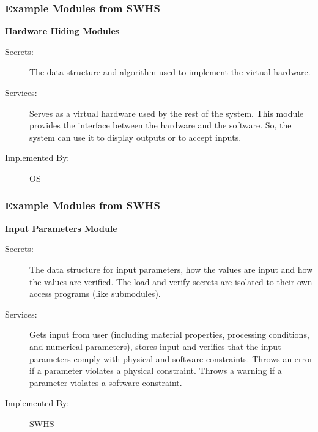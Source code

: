 \documentclass[t,12pt,numbers,fleqn]{beamer}
\begin{document}

\begin{frame}
\frametitle{Example Modules from SWHS}

\textbf{Hardware Hiding Modules}

\begin{description}
\item[Secrets:] The data structure and algorithm used to implement the virtual
  hardware.
\item[Services:] Serves as a virtual hardware used by the rest of the
  system. This module provides the interface between the hardware and the
  software. So, the system can use it to display outputs or to accept inputs.
\item[Implemented By:] OS
\end{description}

\end{frame}


\begin{frame}
\frametitle{Example Modules from SWHS}

\textbf{Input Parameters Module}

\begin{description}
\item[Secrets:] The data structure for input parameters, how the
values are input and how the values are verified.  The load and verify secrets
are isolated to their own access programs (like submodules). %
\item[Services:] Gets input from user (including material properties, processing
  conditions, and numerical parameters), stores input and verifies that the
  input parameters comply with physical and software constraints. Throws an
  error if a parameter violates a physical constraint. Throws a warning if a
  parameter violates a software constraint.  %
\item[Implemented By:] SWHS
\end{description}

\end{frame}

\end{document}
